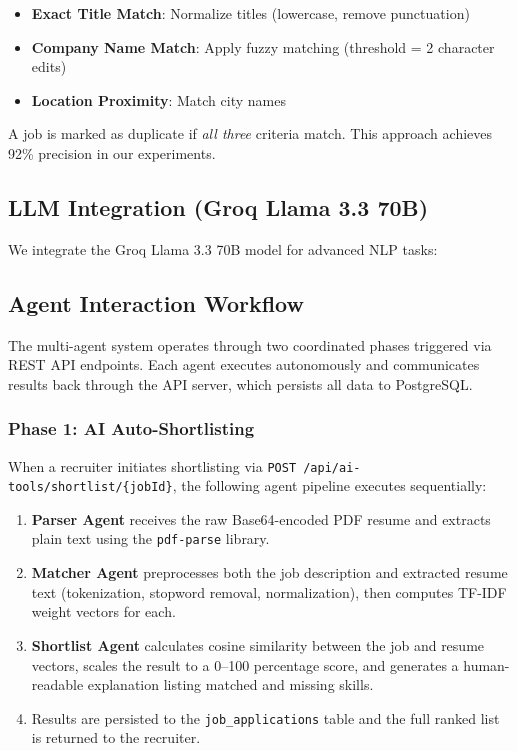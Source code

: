 \documentclass[conference]{IEEEtran}
\begin{document}
\begin{itemize}
    \item \textbf{Exact Title Match}: Normalize titles (lowercase, remove punctuation)
    \item \textbf{Company Name Match}: Apply fuzzy matching (threshold = 2 character edits)
    \item \textbf{Location Proximity}: Match city names
\end{itemize}

A job is marked as duplicate if \textit{all three} criteria match. This approach achieves 92\% precision in our experiments.

\subsection{LLM Integration (Groq Llama 3.3 70B)}

We integrate the Groq Llama 3.3 70B model for advanced NLP tasks:


\subsection{Agent Interaction Workflow}

The multi-agent system operates through two coordinated phases triggered via REST API endpoints. Each agent executes autonomously and communicates results back through the API server, which persists all data to PostgreSQL.

\subsubsection{Phase 1: AI Auto-Shortlisting}

When a recruiter initiates shortlisting via \texttt{POST /api/ai-tools/shortlist/\{jobId\}}, the following agent pipeline executes sequentially:

\begin{enumerate}
    \item \textbf{Parser Agent} receives the raw Base64-encoded PDF resume and extracts plain text using the \texttt{pdf-parse} library.
    \item \textbf{Matcher Agent} preprocesses both the job description and extracted resume text (tokenization, stopword removal, normalization), then computes TF-IDF weight vectors for each.
    \item \textbf{Shortlist Agent} calculates cosine similarity between the job and resume vectors, scales the result to a 0--100 percentage score, and generates a human-readable explanation listing matched and missing skills.
    \item Results are persisted to the \texttt{job\_applications} table and the full ranked list is returned to the recruiter.
\end{enumerate}
\end{document}
